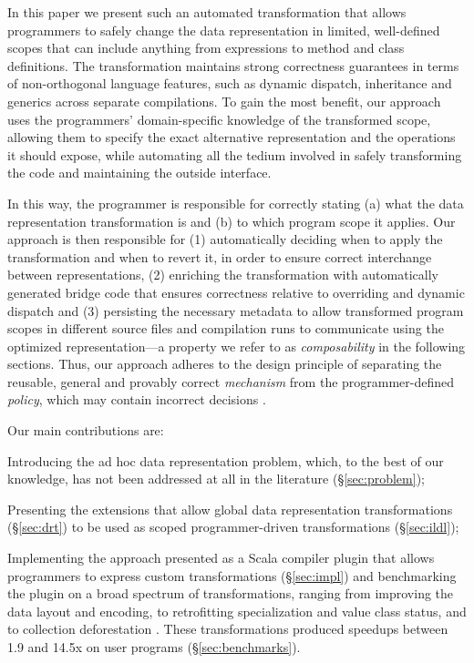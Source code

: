 In this paper we present such an automated transformation that allows programmers to safely change the data representation in limited, well-defined scopes that can include anything from expressions to method and class definitions. The transformation maintains strong correctness guarantees in terms of non-orthogonal language features, such as dynamic dispatch, inheritance and generics across separate compilations. To gain the most benefit, our approach uses the programmers' domain-specific knowledge of the transformed scope, allowing them to specify the exact alternative representation and the operations it should expose, while automating all the tedium involved in safely transforming the code and maintaining the outside interface.

In this way, the programmer is responsible for correctly stating (a) what the data representation transformation is and (b) to which program scope it applies. Our approach is then responsible for (1) automatically deciding when to apply the transformation and when to revert it, in order to ensure correct interchange between representations, (2) enriching the transformation with automatically generated bridge code that ensures correctness relative to overriding and dynamic dispatch and (3) persisting the necessary metadata to allow transformed program scopes in different source files and compilation runs to communicate using the optimized representation---a property we refer to as \emph{composability} in the following sections. Thus, our approach adheres to the design principle of separating the reusable, general and provably correct \emph{mechanism} from the programmer-defined \emph{policy}, which may contain incorrect decisions \cite{lampson-mechanism-policy}.

Our main contributions are:
\begin{compactitem}
  \item Introducing the ad hoc data representation problem, which, to the best of our knowledge, has not been addressed at all in the literature (\S\ref{sec:problem});
  \item Presenting the extensions that allow global data representation transformations (\S\ref{sec:drt}) to be used as scoped programmer-driven transformations (\S\ref{sec:ildl});
  \item Implementing the approach presented as a Scala compiler plugin \cite{ildl-plugin} that allows programmers to express custom transformations (\S\ref{sec:impl}) and benchmarking the plugin on a broad spectrum of transformations, ranging from improving the data layout and encoding, to retrofitting specialization and value class status, and to collection deforestation \cite{wadler-deforestation}. These transformations produced  speedups between 1.9 and 14.5x on user programs (\S\ref{sec:benchmarks}).
\end{compactitem}

